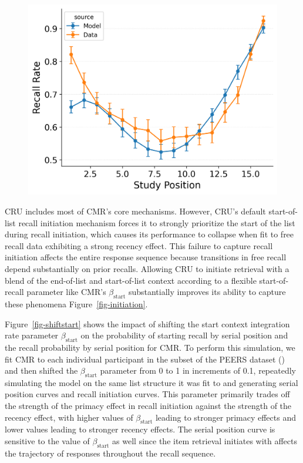 \documentclass[
  man,
  floatsintext,
  longtable,
  nolmodern,
  notxfonts,
  notimes,
  draftfirst,
  colorlinks=true,linkcolor=blue,citecolor=blue,urlcolor=blue]{apa7}
\begin{document}
\begin{figure}
\begin{minipage}{0.33\linewidth}
\includegraphics{figures/HealeyKahana2014_CRU_with_Primacy_and_StartDrift_Fitting_spc.png}\end{minipage}%

\end{figure}%

CRU includes most of CMR's core mechanisms. However, CRU's default
start-of-list recall initiation mechanism forces it to strongly
prioritize the start of the list during recall initiation, which causes
its performance to collapse when fit to free recall data exhibiting a
strong recency effect. This failure to capture recall initiation affects
the entire response sequence because transitions in free recall depend
substantially on prior recalls. Allowing CRU to initiate retrieval with
a blend of the end-of-list and start-of-list context according to a
flexible start-of-recall parameter like CMR's \(\beta_\text{start}\)
substantially improves its ability to capture these phenomena
Figure~\ref{fig-initiation}.

Figure~\ref{fig-shiftstart} shows the impact of shifting the start
context integration rate parameter \(\beta_\text{start}\) on the
probability of starting recall by serial position and the recall
probability by serial position for CMR. To perform this simulation, we
fit CMR to each individual participant in the subset of the PEERS
dataset () and
then shifted the \(\beta_\text{start}\) parameter from 0 to 1 in
increments of 0.1, repeatedly simulating the model on the same list
structure it was fit to and generating serial position curves and recall
initiation curves. This parameter primarily trades off the strength of
the primacy effect in recall initiation against the strength of the
recency effect, with higher values of \(\beta_\text{start}\) leading to
stronger primacy effects and lower values leading to stronger recency
effects. The serial position curve is sensitive to the value of
\(\beta_\text{start}\) as well since the item retrieval initiates with
affects the trajectory of responses throughout the recall sequence.
\end{document}
